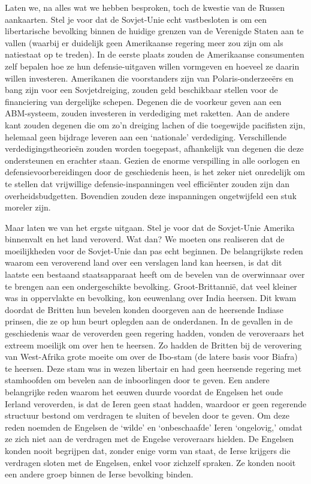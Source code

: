 \documentclass[
  a5paper,
  smalldemyvopaper,10pt,twoside,onecolumn,openright,extrafontsizes,hidelinks]{memoir}
\begin{document}
Laten we, na alles wat we hebben besproken, toch de kwestie van de
Russen aankaarten. Stel je voor dat de Sovjet-Unie echt vastbesloten is
om een libertarische bevolking binnen de huidige grenzen van de
Verenigde Staten aan te vallen (waarbij er duidelijk geen Amerikaanse
regering meer zou zijn om als natiestaat op te treden). In de eerste
plaats zouden de Amerikaanse consumenten zelf bepalen hoe ze hun
defensie-uitgaven willen vormgeven en hoeveel ze daarin willen
investeren. Amerikanen die voorstanders zijn van Polaris-onderzeeërs en
bang zijn voor een Sovjetdreiging, zouden geld beschikbaar stellen voor
de financiering van dergelijke schepen. Degenen die de voorkeur geven
aan een ABM-systeem, zouden investeren in verdediging met raketten. Aan
de andere kant zouden degenen die om zo'n dreiging lachen of die
toegewijde pacifisten zijn, helemaal geen bijdrage leveren aan een
`nationale' verdediging. Verschillende verdedigingstheorieën zouden
worden toegepast, afhankelijk van degenen die deze ondersteunen en
erachter staan. Gezien de enorme verspilling in alle oorlogen en
defensievoorbereidingen door de geschiedenis heen, is het zeker niet
onredelijk om te stellen dat vrijwillige defensie-inspanningen veel
efficiënter zouden zijn dan overheidsbudgetten. Bovendien zouden deze
inspanningen ongetwijfeld een stuk moreler zijn.

Maar laten we van het ergste uitgaan. Stel je voor dat de Sovjet-Unie
Amerika binnenvalt en het land veroverd. Wat dan? We moeten ons
realiseren dat de moeilijkheden voor de Sovjet-Unie dan pas echt
beginnen. De belangrijkste reden waarom een veroverend land over een
verslagen land kan heersen, is dat dit laatste een bestaand
staatsapparaat heeft om de bevelen van de overwinnaar over te brengen
aan een ondergeschikte bevolking. Groot-Brittannië, dat veel kleiner was
in oppervlakte en bevolking, kon eeuwenlang over India heersen. Dit kwam
doordat de Britten hun bevelen konden doorgeven aan de heersende Indiase
prinsen, die ze op hun beurt oplegden aan de onderdanen. In de gevallen
in de geschiedenis waar de veroverden geen regering hadden, vonden de
veroveraars het extreem moeilijk om over hen te heersen. Zo hadden de
Britten bij de verovering van West-Afrika grote moeite om over de
Ibo-stam (de latere basis voor Biafra) te heersen. Deze stam was in
wezen libertair en had geen heersende regering met stamhoofden om
bevelen aan de inboorlingen door te geven. Een andere belangrijke reden
waarom het eeuwen duurde voordat de Engelsen het oude Ierland
veroverden, is dat de Ieren geen staat hadden, waardoor er geen
regerende structuur bestond om verdragen te sluiten of bevelen door te
geven. Om deze reden noemden de Engelsen de `wilde' en `onbeschaafde'
Ieren `ongelovig,' omdat ze zich niet aan de verdragen met de Engelse
veroveraars hielden. De Engelsen konden nooit begrijpen dat, zonder
enige vorm van staat, de Ierse krijgers die verdragen sloten met de
Engelsen, enkel voor zichzelf spraken. Ze konden nooit een andere groep
binnen de Ierse bevolking binden.
\end{document}
